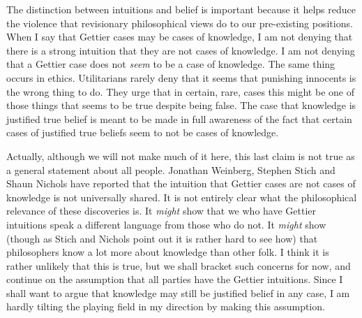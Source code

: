 The distinction between intuitions and belief is important because it helps reduce the violence that revisionary philosophical views do to our pre-existing positions. When I say that Gettier cases may be cases of knowledge, I am not denying that there is a strong intuition that they are not cases of knowledge. I am not denying that a Gettier case does not \textit{seem} to be a case of knowledge. The same thing occurs in ethics. Utilitarians rarely deny that it seems that punishing innocents is the wrong thing to do. They urge that in certain, rare, cases this might be one of those things that seems to be true despite being false. The case that knowledge is justified true belief is meant to be made in full awareness of the fact that certain cases of justified true beliefs seem to not be cases of knowledge.

Actually, although we will not make much of it here, this last claim is not true as a general statement about all people. Jonathan Weinberg, Stephen Stich and Shaun Nichols have reported \citet{Weinberg2001} that the intuition that Gettier cases are not cases of knowledge is not universally shared. It is not entirely clear what the philosophical relevance of these discoveries is. It \textit{might }show that we who have Gettier intuitions speak a different language from those who do not. It \textit{might }show (though as Stich and Nichols point out it is rather hard to see how) that philosophers know a lot more about knowledge than other folk. I think it is rather unlikely that this is true, but we shall bracket such concerns for now, and continue on the assumption that all parties have the Gettier intuitions. Since I shall want to argue that knowledge may still be justified belief in any case, I am hardly tilting the playing field in my direction by making this assumption.

